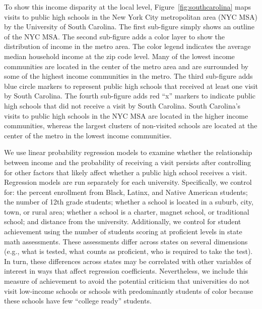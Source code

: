 \documentclass[twoside]{article}
\begin{document}
To show this income disparity at the local level, Figure~\ref{fig:southcarolina} maps visits to public high schools in the New York City metropolitan area (NYC MSA) by the University of South Carolina. The first sub-figure simply shows an outline of the NYC MSA. The second sub-figure adds a color layer to show the distribution of income in the metro area. The color legend indicates the average median household income at the zip code level. Many of the lowest income communities are located in the center of the metro area and are surrounded by some of the highest income communities in the metro. The third sub-figure adds blue circle markers to represent public high schools that received at least one visit by South Carolina. The fourth sub-figure adds red ``x'' markers to indicate public high schools that did not receive a visit by South Carolina.  South Carolina's visits to public high schools in the NYC MSA are located in the higher income communities, whereas the largest clusters of non-visited schools are located at the center of the metro in the lowest income communities.

We use linear probability regression models to examine whether the relationship between income and the probability of receiving a visit persists after controlling for other factors that likely affect whether a public high school receives a visit. Regression models are run separately for each university. Specifically, we control for: the percent enrollment from Black, Latinx, and Native American students; the number of 12th grade students; whether a school is located in a suburb, city, town, or rural area; whether a school is a charter, magnet school, or traditional school; and distance from the university. Additionally, we control for student achievement using the number of students scoring at proficient levels in state math assessments. These assessments differ across states on several dimensions (e.g., what is tested, what counts as proficient, who is required to take the test). In turn, these differences across states may be correlated with other variables of interest in ways that affect regression coefficients. Nevertheless, we include this measure of achievement to avoid the potential criticism that universities do not visit low-income schools or schools with predominantly students of color because these schools have few ``college ready'' students.

\end{document}
